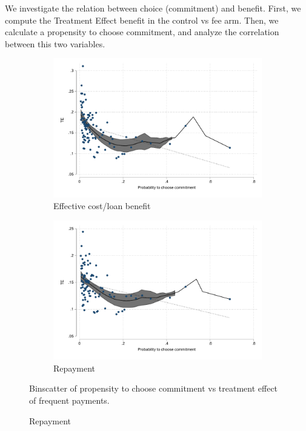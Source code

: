 \documentclass[oneside,11pt]{article}
\begin{document}
We investigate the relation between choice (commitment) and benefit. First, we compute the Treatment Effect benefit in the control vs fee arm. Then, we calculate a propensity to choose commitment, and analyze the correlation between this two variables. 




\begin{figure}[H]
    \caption{}
    \label{}
    \begin{center}
    \begin{subfigure}{0.475\textwidth}
        \caption{Effective cost/loan benefit}
        \centering
        \includegraphics[width=\textwidth]{Figuras/benefit_choice_tau_eff.pdf}
    \end{subfigure}
    \begin{subfigure}{0.475\textwidth}
        \caption{Repayment}
        \centering
        \includegraphics[width=\textwidth]{Figuras/benefit_choice_tau_des.pdf}
    \end{subfigure}
  
    \end{center}
     \scriptsize    Binscatter of propensity to choose commitment vs treatment effect of frequent payments.
\end{figure}
\end{document}

